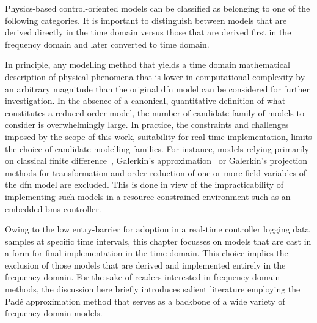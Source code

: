 Physics-based control-oriented models  can be classified as belonging  to one of
the following categories. It
is important to distinguish between models that are derived directly in the time
domain versus  those that are  derived first in  the frequency domain  and later
converted to time domain.


In  principle,  any modelling  method  that  yields a  time domain  mathematical
description of physical  phenomena that is lower in  computational complexity by
an arbitrary magnitude  than the original \gls{dfn} model can  be considered for
further investigation. In the absence of a canonical, quantitative definition of
what  constitutes a  reduced  order model,  the number  of  candidate family  of
models  to  consider  is  overwhelmingly large.  In  practice,  the  constraints  and  challenges  imposed  by
the  scope  of  this  work, \viz{}  suitability  for  real-time  implementation,
limits  the  choice  of  candidate  modelling  families.  For  instance,  models
relying  primarily on  classical finite  difference~\cite{Smith2006}, Galerkin's
approximation~\cite{Dao2012} or Galerkin's projection~\cite{Fan2018} methods for
transformation  and order  reduction  of  one or  more  field  variables of  the
\gls{dfn} model  are excluded. This is  done in view of  the impracticability of
implementing  such  models in  a  resource-constrained  environment such  as  an
embedded \gls{bms} controller.


Owing to  the low entry-barrier for  adoption in a real-time  controller logging
data samples  at specific time intervals,  this chapter focusses on  models that
are cast  in a  form for final  implementation in the  time domain.  This choice
implies the exclusion of those models  that are derived and implemented entirely
in the frequency domain. For the  sake of readers interested in frequency domain
methods, the discussion here briefly introduces salient literature employing the
Padé  approximation method  that serves  as  a backbone  of a  wide variety  of
frequency domain models.





